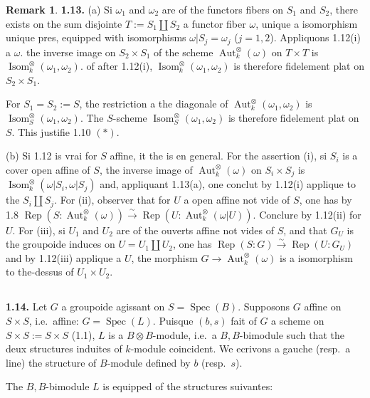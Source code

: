 \documentclass[12pt,a4paper]{article}
\theoremstyle{plain}
\theoremstyle{definition}
\newtheorem{remark}[theorem]{Remark}
\theoremstyle{remark}
\DeclareMathOperator{\Aut}{Aut}
\DeclareMathOperator{\Isom}{Isom}
\DeclareMathOperator{\Spec}{Spec}
\DeclareMathOperator{\Rep}{Rep}
\begin{document}
\begin{remark}
\textbf{1.13.} (a) Si $\omega_1$ and $\omega_2$ are of the functors fibers on $S_1$ and $S_2$, there exists on the sum disjointe $T := S_1 \amalg S_2$ a functor fiber $\omega$, unique a isomorphism unique pres, equipped with  isomorphisms $\omega|S_j = \omega_j$ ($j = 1,2$). Appliquons 1.12(i) a $\omega$. the inverse image on $S_2 \times S_1$ of the scheme $\Aut^\otimes_k(\omega)$ on $T \times T$ is $\Isom^\otimes_k(\omega_1,\omega_2)$. of after 1.12(i), $\Isom^\otimes_k(\omega_1,\omega_2)$ is therefore fidelement plat on $S_2 \times S_1$.

For $S_1 = S_2 := S$, the restriction a the diagonale of $\Aut^\otimes_k(\omega_1,\omega_2)$ is $\Isom^\otimes_S(\omega_1,\omega_2)$. The $S$-scheme $\Isom^\otimes_S(\omega_1,\omega_2)$ is therefore fidelement plat on $S$. This justifie 1.10 $(*)$.

(b) Si 1.12 is vrai for $S$ affine, it the is en general. For the assertion (i), si $S_i$ is a cover open affine of $S$, the inverse image of $\Aut^\otimes_k(\omega)$ on $S_i \times S_j$ is $\Isom^\otimes_k(\omega|S_i, \omega|S_j)$ and, appliquant 1.13(a), one conclut by 1.12(i) applique to the $S_i \amalg S_j$. For (ii), observer that for $U$ a open affine not vide of $S$, one has by 1.8 $\Rep(S:\Aut^\otimes_k(\omega)) \xrightarrow{\sim} \Rep(U:\Aut^\otimes_k(\omega|U))$. Conclure by 1.12(ii) for $U$. For (iii), si $U_1$ and $U_2$ are of the ouverts affine not vides of $S$, and that $G_U$ is the groupoide induces on $U = U_1 \amalg U_2$, one has $\Rep(S:G) \xrightarrow{\sim} \Rep(U:G_U)$ and by 1.12(iii) applique a $U$, the morphism $G \to \Aut^\otimes_k(\omega)$ is a isomorphism to the-dessus of $U_1 \times U_2$.
\end{remark}

\subsection{}

\textbf{1.14.} Let $G$ a groupoide agissant on $S = \Spec(B)$. Supposons $G$ affine on $S \times S$, i.e.~affine: $G = \Spec(L)$. Puisque $(b,s)$ fait of $G$ a scheme on $S \times S := S \times S$ (1.1), $L$ is a $B \otimes B$-module, i.e.~a $B,B$-bimodule such that the deux structures induites of $k$-module coincident. We ecrivons a gauche (resp.~a line) the structure of $B$-module defined by $b$ (resp.~$s$).

The $B,B$-bimodule $L$ is equipped of the structures suivantes:
\end{document}
